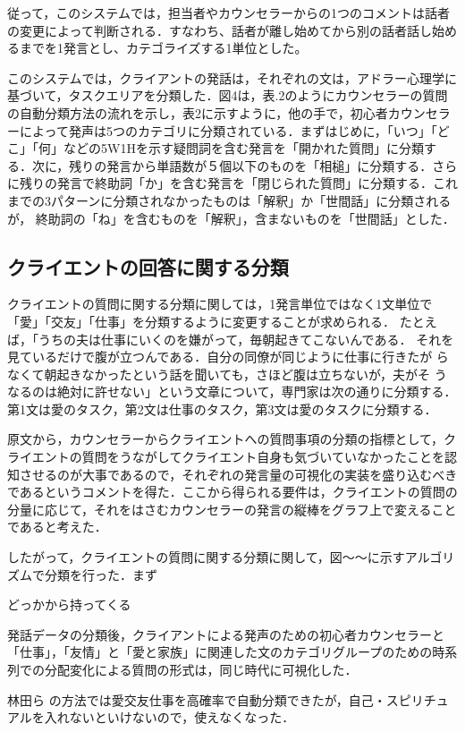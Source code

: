 \documentclass[shuuron]{kuee}
\begin{document}
従って，このシステムでは，担当者やカウンセラーからの1つのコメントは話者の変更によって判断される．すなわち、話者が離し始めてから別の話者話し始めるまでを1発言とし、カテゴライズする1単位とした。

このシステムでは，クライアントの発話は，それぞれの文は，アドラー心理学に基づいて，タスクエリアを分類した．図4は，表.2のようにカウンセラーの質問の自動分類方法の流れを示し，表2に示すように，他の手で，初心者カウンセラーによって発声は5つのカテゴリに分類されている．まずはじめに，「いつ」「どこ」「何」などの5W1Hを示す疑問詞を含む発言を「開かれた質問」に分類する．次に，残りの発言から単語数が５個以下のものを「相槌」に分類する．さらに残りの発言で終助詞「か」を含む発言を「閉じられた質問」に分類する．これまでの3パターンに分類されなかったものは「解釈」か「世間話」に分類されるが，
終助詞の「ね」を含むものを「解釈」，含まないものを「世間話」とした．


\subsection{クライエントの回答に関する分類} %


クライエントの質問に関する分類に関しては，1発言単位ではなく1文単位で「愛」「交友」「仕事」を分類するように変更することが求められる．
たとえば，「うちの夫は仕事にいくのを嫌がって，毎朝起きてこないんである．
それを見ているだけで腹が立つんである．自分の同僚が同じように仕事に行きたが
らなくて朝起きなかったという話を聞いても，さほど腹は立ちないが，夫がそ
うなるのは絶対に許せない」という文章について，専門家は次の通りに分類する．第1文は愛のタスク，第2文は仕事のタスク，第3文は愛のタスクに分類する．

原文から，カウンセラーからクライエントへの質問事項の分類の指標として，クライエントの質問をうながしてクライエント自身も気づいていなかったことを認知させるのが大事であるので，それぞれの発言量の可視化の実装を盛り込むべきであるというコメントを得た．ここから得られる要件は，クライエントの質問の分量に応じて，それをはさむカウンセラーの発言の縦棒をグラフ上で変えることであると考えた．

したがって，クライエントの質問に関する分類に関して，図〜〜に示すアルゴリズムで分類を行った．まず

どっかから持ってくる

発話データの分類後，クライアントによる発声のための初心者カウンセラーと「仕事」，「友情」と「愛と家族」に関連した文のカテゴリグループのための時系列での分配変化による質問の形式は，同じ時代に可視化した．

林田ら\cite{hayashidaJp} \cite{hayashidaEn}の方法では愛交友仕事を高確率で自動分類できたが，自己・スピリチュアルを入れないといけないので，使えなくなった．
\end{document}
